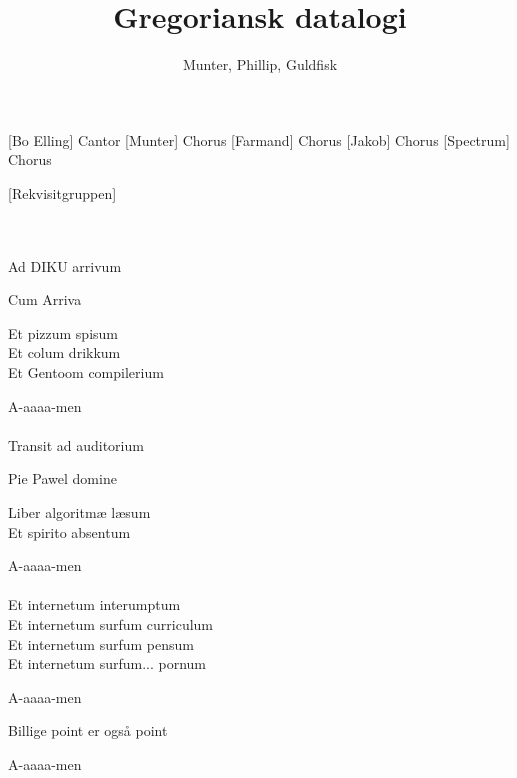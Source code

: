 \documentclass[a4paper,11pt]{article}
\title{Gregoriansk datalogi}
\author{Munter, Phillip, Guldfisk}
\begin{document}
\maketitle

\begin{roles}
[Bo Elling] Cantor
[Munter] Chorus
[Farmand] Chorus
[Jakob] Chorus
[Spectrum] Chorus
\end{roles}

\begin{props}
[Rekvisitgruppen]
\end{props}

  
\begin{sketch}

\\
\\

 Ad DIKU arrivum

 Cum Arriva

 Et pizzum spisum\\
Et colum drikkum\\
Et Gentoom compilerium

 A-aaaa-men\\
\\


 Transit ad auditorium

 Pie Pawel domine

 Liber algoritm\ae{} l\ae{}sum\\
Et spirito absentum

 A-aaaa-men\\
\\


 Et internetum interumptum\\
Et internetum surfum curriculum\\
Et internetum surfum pensum\\
Et internetum surfum... pornum

 A-aaaa-men

 Billige point er ogs\aa{} point 

 A-aaaa-men


\end{sketch}
\end{document}
